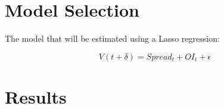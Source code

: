 \documentclass[english, 11pt, a4paper]{article}
\begin{document}
\section{Model Selection}
The model that will be estimated using a Lasso regression:

\begin{equation}
    V(t + \delta) = Spread_{t} + OI_{t} + \epsilon 
\end{equation}

\section{Results}



%
\end{document}
